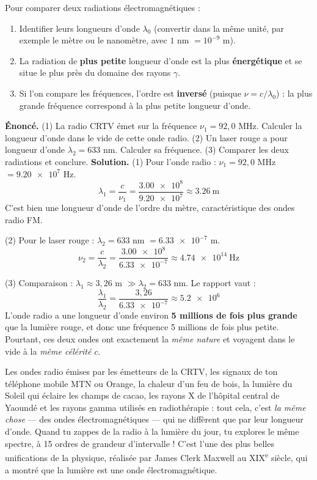 \documentclass[11pt]{article}
\begin{document}
\begin{methode}
Pour comparer deux radiations électromagnétiques :
\begin{enumerate}
\item Identifier leurs longueurs d'onde $\lambda_0$ (convertir dans la même unité, par exemple le mètre ou le nanomètre, avec $1$ nm $= 10^{-9}$ m).
\item La radiation de \textbf{plus petite} longueur d'onde est la plus \textbf{énergétique} et se situe le plus près du domaine des rayons $\gamma$.
\item Si l'on compare les fréquences, l'ordre est \textbf{inversé} (puisque $\nu = c/\lambda_0$) : la plus grande fréquence correspond à la plus petite longueur d'onde.
\end{enumerate}
\end{methode}

\begin{exoresolu}
\textbf{Énoncé.} (1) La radio CRTV émet sur la fréquence $\nu_1 = 92{,}0$ MHz. Calculer la longueur d'onde dans le vide de cette onde radio. (2) Un laser rouge a pour longueur d'onde $\lambda_2 = 633$ nm. Calculer sa fréquence. (3) Comparer les deux radiations et conclure.
\tcblower
\textbf{Solution.} (1) Pour l'onde radio : $\nu_1 = 92{,}0$ MHz $= \num{9,20e7}$ Hz.
\[ \lambda_1 = \frac{c}{\nu_1} = \frac{\num{3,00e8}}{\num{9,20e7}} \approx \num{3,26}~\text{m} \]
C'est bien une longueur d'onde de l'ordre du mètre, caractéristique des ondes radio FM.

(2) Pour le laser rouge : $\lambda_2 = 633$ nm $= \num{6,33e-7}$ m.
\[ \nu_2 = \frac{c}{\lambda_2} = \frac{\num{3,00e8}}{\num{6,33e-7}} \approx \num{4,74e14}~\text{Hz} \]

(3) Comparaison : $\lambda_1 \approx 3{,}26$ m $\gg \lambda_2 = 633$ nm. Le rapport vaut :
\[ \frac{\lambda_1}{\lambda_2} = \frac{3{,}26}{\num{6,33e-7}} \approx \num{5,2e6} \]
L'onde radio a une longueur d'onde environ \textbf{5 millions de fois plus grande} que la lumière rouge, et donc une fréquence 5 millions de fois plus petite. Pourtant, ces deux ondes ont exactement la \emph{même nature} et voyagent dans le vide à la \emph{même célérité} $c$.
\end{exoresolu}

\begin{savaistu}
Les ondes radio émises par les émetteurs de la CRTV, les signaux de ton téléphone mobile MTN ou Orange, la chaleur d'un feu de bois, la lumière du Soleil qui éclaire les champs de cacao, les rayons X de l'hôpital central de Yaoundé et les rayons gamma utilisés en radiothérapie : tout cela, c'est \emph{la même chose} — des ondes électromagnétiques — qui ne diffèrent que par leur longueur d'onde. Quand tu zappes de la radio à la lumière du jour, tu explores le même spectre, à 15 ordres de grandeur d'intervalle ! C'est l'une des plus belles unifications de la physique, réalisée par James Clerk Maxwell au XIX\textsuperscript{e} siècle, qui a montré que la lumière est une onde électromagnétique.
\end{savaistu}
\end{document}
